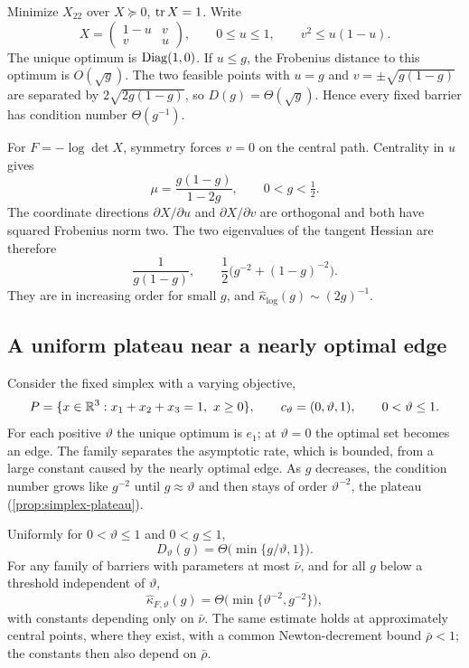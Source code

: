 \begin{example}
\label{ex:curved-singleton}
Minimize $X_{22}$ over $X\succeq0$, $\operatorname{tr} X=1$. Write
\[
 X=\begin{pmatrix}1-u&v\\v&u\end{pmatrix},\qquad
 0\leq u\leq1,\qquad v^2\leq u(1-u).
\]
The unique optimum is $\operatorname{Diag}(1,0)$. If $u\leq g$, the Frobenius
distance to this optimum is $O(\sqrt g)$. The two feasible points with
$u=g$ and $v=\pm\sqrt{g(1-g)}$ are separated by
$2\sqrt{2g(1-g)}$, so $D(g)=\Theta(\sqrt g)$. Hence every fixed
barrier has condition number $\Theta(g^{-1})$.

For $F=-\log\det X$, symmetry forces $v=0$ on the central path.
Centrality in $u$ gives
\[
 \mu=\frac{g(1-g)}{1-2g},\qquad 0<g<\tfrac12.
\]
The coordinate directions $\partial X/\partial u$ and
$\partial X/\partial v$ are orthogonal and both have squared Frobenius
norm two. The two eigenvalues of the tangent Hessian are therefore
\[
 \frac{1}{g(1-g)},\qquad
 \frac12\bigl(g^{-2}+(1-g)^{-2}\bigr).
\]
They are in increasing order for small $g$, and
$\widehat\kappa_{\log}(g)\sim(2g)^{-1}$.
\end{example}

\subsection{A uniform plateau near a nearly optimal edge}

Consider the fixed simplex with a varying objective,
\begin{equation}
 P=\{x\in\mathbb R^3:x_1+x_2+x_3=1,\ x\geq0\},\qquad
 c_\vartheta=(0,\vartheta,1),\qquad 0<\vartheta\leq1.
 \label{eq:near-simplex}
\end{equation}
For each positive $\vartheta$ the unique optimum is $e_1$; at
$\vartheta=0$ the optimal set becomes an edge. The family separates the
asymptotic rate, which is bounded, from a large constant caused by the
nearly optimal edge. As $g$ decreases, the condition number grows like
$g^{-2}$ until $g\approx\vartheta$ and then stays of order
$\vartheta^{-2}$, the plateau (\cref{prop:simplex-plateau}).

\begin{proposition}
\label{prop:simplex-plateau}
Uniformly for $0<\vartheta\leq1$ and $0<g\leq1$,
\begin{equation}
 D_\vartheta(g)=\Theta\bigl(\min\{g/\vartheta,1\}\bigr).
 \label{eq:simplex-diameter}
\end{equation}
For any family of barriers with parameters at most $\bar\nu$, and for
all $g$ below a threshold independent of $\vartheta$,
\begin{equation}
 \widehat\kappa_{F,\vartheta}(g)
 =\Theta\bigl(\min\{\vartheta^{-2},g^{-2}\}\bigr),
 \label{eq:simplex-plateau}
\end{equation}
with constants depending only on $\bar\nu$. The same estimate holds
at approximately central points, where they exist, with a common Newton-decrement
bound $\bar\rho<1$; the constants then also depend on $\bar\rho$.
\end{proposition}

